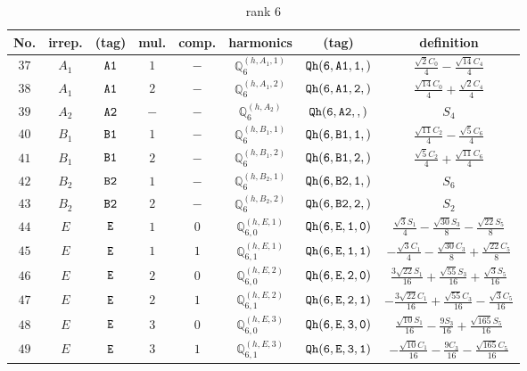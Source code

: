 \documentclass[fleqn,8pt]{jsarticle}
\begin{document}
\begin{table}[ht!]
\begin{center}
\caption{rank 6}
\renewcommand{\arraystretch}{1.3}
\begin{tabular}{cccccccc} \hline \hline
No. & irrep. & (tag) & mul. & comp. & harmonics & (tag) & definition \\ \hline
$ 37 $ & $ A_{1} $ & $ {\tt A1} $ & $ 1 $ & $ - $ & $ \mathbb{Q}_{6}^{(h,A_{1},1)} $ & $ {\tt Qh(6,A1,1,)} $ & $ \frac{\sqrt{2} C_{0}}{4} - \frac{\sqrt{14} C_{4}}{4} $ \\
$ 38 $ & $ A_{1} $ & $ {\tt A1} $ & $ 2 $ & $ - $ & $ \mathbb{Q}_{6}^{(h,A_{1},2)} $ & $ {\tt Qh(6,A1,2,)} $ & $ \frac{\sqrt{14} C_{0}}{4} + \frac{\sqrt{2} C_{4}}{4} $ \\
$ 39 $ & $ A_{2} $ & $ {\tt A2} $ & $ - $ & $ - $ & $ \mathbb{Q}_{6}^{(h,A_{2})} $ & $ {\tt Qh(6,A2,,)} $ & $ S_{4} $ \\
$ 40 $ & $ B_{1} $ & $ {\tt B1} $ & $ 1 $ & $ - $ & $ \mathbb{Q}_{6}^{(h,B_{1},1)} $ & $ {\tt Qh(6,B1,1,)} $ & $ \frac{\sqrt{11} C_{2}}{4} - \frac{\sqrt{5} C_{6}}{4} $ \\
$ 41 $ & $ B_{1} $ & $ {\tt B1} $ & $ 2 $ & $ - $ & $ \mathbb{Q}_{6}^{(h,B_{1},2)} $ & $ {\tt Qh(6,B1,2,)} $ & $ \frac{\sqrt{5} C_{2}}{4} + \frac{\sqrt{11} C_{6}}{4} $ \\
$ 42 $ & $ B_{2} $ & $ {\tt B2} $ & $ 1 $ & $ - $ & $ \mathbb{Q}_{6}^{(h,B_{2},1)} $ & $ {\tt Qh(6,B2,1,)} $ & $ S_{6} $ \\
$ 43 $ & $ B_{2} $ & $ {\tt B2} $ & $ 2 $ & $ - $ & $ \mathbb{Q}_{6}^{(h,B_{2},2)} $ & $ {\tt Qh(6,B2,2,)} $ & $ S_{2} $ \\
$ 44 $ & $ E $ & $ {\tt E} $ & $ 1 $ & $ 0 $ & $ \mathbb{Q}_{6,0}^{(h,E,1)} $ & $ {\tt Qh(6,E,1,0)} $ & $ \frac{\sqrt{3} S_{1}}{4} - \frac{\sqrt{30} S_{3}}{8} - \frac{\sqrt{22} S_{5}}{8} $ \\
$ 45 $ & $ E $ & $ {\tt E} $ & $ 1 $ & $ 1 $ & $ \mathbb{Q}_{6,1}^{(h,E,1)} $ & $ {\tt Qh(6,E,1,1)} $ & $ - \frac{\sqrt{3} C_{1}}{4} - \frac{\sqrt{30} C_{3}}{8} + \frac{\sqrt{22} C_{5}}{8} $ \\
$ 46 $ & $ E $ & $ {\tt E} $ & $ 2 $ & $ 0 $ & $ \mathbb{Q}_{6,0}^{(h,E,2)} $ & $ {\tt Qh(6,E,2,0)} $ & $ \frac{3 \sqrt{22} S_{1}}{16} + \frac{\sqrt{55} S_{3}}{16} + \frac{\sqrt{3} S_{5}}{16} $ \\
$ 47 $ & $ E $ & $ {\tt E} $ & $ 2 $ & $ 1 $ & $ \mathbb{Q}_{6,1}^{(h,E,2)} $ & $ {\tt Qh(6,E,2,1)} $ & $ - \frac{3 \sqrt{22} C_{1}}{16} + \frac{\sqrt{55} C_{3}}{16} - \frac{\sqrt{3} C_{5}}{16} $ \\
$ 48 $ & $ E $ & $ {\tt E} $ & $ 3 $ & $ 0 $ & $ \mathbb{Q}_{6,0}^{(h,E,3)} $ & $ {\tt Qh(6,E,3,0)} $ & $ \frac{\sqrt{10} S_{1}}{16} - \frac{9 S_{3}}{16} + \frac{\sqrt{165} S_{5}}{16} $ \\
$ 49 $ & $ E $ & $ {\tt E} $ & $ 3 $ & $ 1 $ & $ \mathbb{Q}_{6,1}^{(h,E,3)} $ & $ {\tt Qh(6,E,3,1)} $ & $ - \frac{\sqrt{10} C_{1}}{16} - \frac{9 C_{3}}{16} - \frac{\sqrt{165} C_{5}}{16} $ \\
 \hline \hline
\end{tabular}
\end{center}
\end{table}
\end{document}
